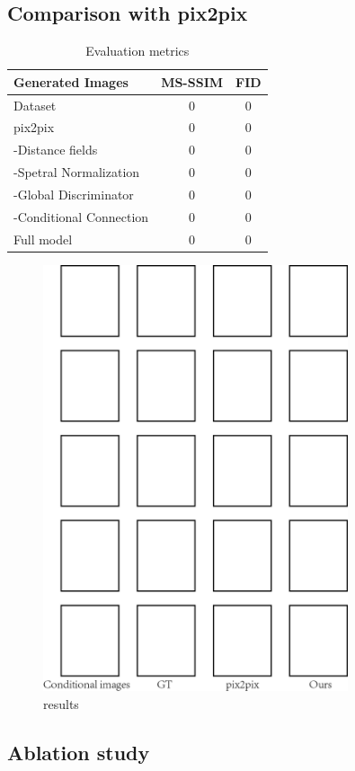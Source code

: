 \subsection{Comparison with pix2pix}
%
%
\begin{table}[h]
	\centering	
	\label{tab:evaluation_metrics}
	\caption{Evaluation metrics }
	\begin{tabular}{|l|c|c|}\hline
		Generated Images & MS-SSIM & FID\\\hline
		Dataset & $0$ & $0$\\
		pix2pix & $0$ & $0$ \\
		-Distance fields & $0$ & $0$\\
		-Spetral Normalization & $0$ & $0$\\
		-Global Discriminator & $0$ & $0$ \\
		-Conditional Connection & $0$ & $0$ \\
		Full model & $0$ & $0$ \\\hline
	\end{tabular}
\end{table}
%
%
\begin{figure}
	\label{fig:results}
	\includegraphics[width=0.8\textwidth]{figures/results}
	\caption{results}
\end{figure}
%
%
\subsection{Ablation study}
